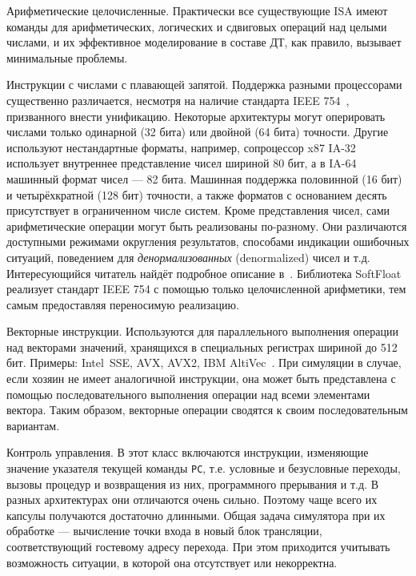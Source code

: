 \begin{description*}
    \item[Арифметические целочисленные.] Практически все существующие ISA имеют команды для арифметических, логических и сдвиговых операций над целыми числами, и их эффективное моделирование в составе ДТ, как правило, вызывает минимальные проблемы.
    
    \item[Инструкции с числами с плавающей запятой.] Поддержка разными процессорами существенно различается, несмотря на наличие стандарта IEEE 754~\cite{ieee754}, призванного внести унификацию. Некоторые архитектуры могут оперировать числами только одинарной (32 бита) или двойной (64 бита) точности. Другие используют нестандартные форматы, например, сопроцессор x87 IA-32 использует внутреннее представление чисел шириной 80 бит, а в IA-64 машинный формат чисел — 82 бита. Машинная поддержка половинной (16 бит) и четырёхкратной (128 бит) точности, а также форматов с основанием десять присутствует в ограниченном числе систем.
    Кроме представления чисел, сами арифметические операции могут быть реализованы по-разному. Они различаются доступными режимами округления результатов, способами индикации ошибочных ситуаций, поведением для \textit{денормализованных} (\abbr denormalized) чисел и т.д. Интересующийся читатель найдёт подробное описание в~\cite{MullerEtAl2010}. Библиотека SoftFloat~\cite{softfloat} реализует стандарт IEEE 754 с помощью только целочисленной арифметики, тем самым предоставляя переносимую реализацию.
    
    \item[Векторные инструкции.] Используются для параллельного выполнения операции над векторами значений, хранящихся в специальных регистрах шириной до 512 бит. Примеры: Intel\textregistered~SSE, AVX, AVX2, IBM AltiVec~\cite{altivec}. При симуляции в случае, если хозяин не имеет аналогичной инструкции, она может быть представлена с помощью последовательного выполнения операции над всеми элементами вектора. Таким образом, векторные операции сводятся к своим последовательным вариантам.
    
    \item[Контроль управления.] В этот класс включаются инструкции, изменяющие значение указателя текущей команды \texttt{PC}, т.е. условные и безусловные переходы, вызовы процедур и возвращения из них, программного прерывания и т.д. В разных архитектурах они отличаются очень сильно. Поэтому чаще всего их капсулы получаются достаточно длинными. Общая задача симулятора при их обработке — вычисление точки входа в новый блок трансляции, соответствующий гостевому адресу перехода. При этом приходится учитывать возможность ситуации, в которой она отсутствует или некорректна. %
    

\end{description*}
